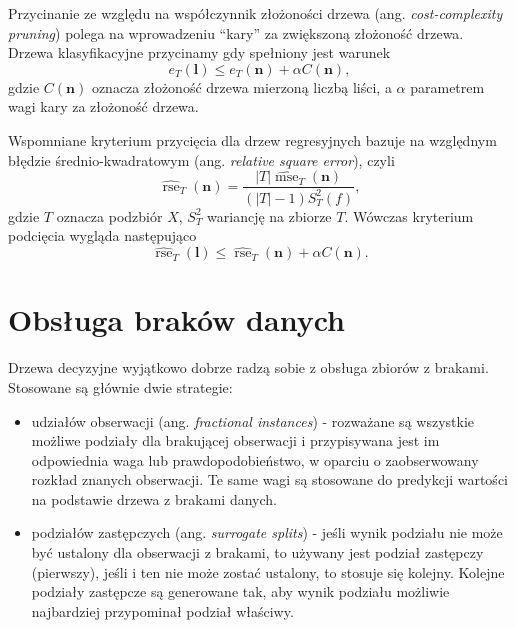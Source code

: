 \documentclass[
]{book}
\providecommand{\tightlist}{%
  \setlength{\itemsep}{0pt}\setlength{\parskip}{0pt}}
\theoremstyle{plain}
\theoremstyle{definition}
\theoremstyle{definition}
\theoremstyle{definition}
\theoremstyle{definition}
\theoremstyle{definition}
\theoremstyle{remark}
\begin{document}
Przycinanie ze względu na współczynnik złożoności drzewa (ang. \emph{cost-complexity pruning}) polega na wprowadzeniu ``kary'' za zwiększoną złożoność drzewa. Drzewa klasyfikacyjne przycinamy gdy spełniony jest warunek
\begin{equation}
    e_T(\mathbf{l})\leq e_T(\mathbf{n})+\alpha C(\mathbf{n}),
\end{equation}
gdzie \(C(\mathbf{n})\) oznacza złożoność drzewa mierzoną liczbą liści, a \(\alpha\) parametrem wagi kary za złożoność drzewa.

Wspomniane kryterium przycięcia dla drzew regresyjnych bazuje na względnym błędzie średnio-kwadratowym (ang. \emph{relative square error}), czyli
\begin{equation}\label{rse}
        \widehat{\operatorname{rse}}_T(\mathbf{n})=\frac{|T|\widehat{\operatorname{mse}}_T(\mathbf{n})}{(|T|-1)S^2_T(f)},
\end{equation}
gdzie \(T\) oznacza podzbiór \(X\), \(S^2_T\) wariancję na zbiorze \(T\).
Wówczas kryterium podcięcia wygląda następująco
\begin{equation}\label{kryterium3}
    \widehat{\operatorname{rse}}_T(\mathbf{l})\leq \widehat{\operatorname{rse}}_T(\mathbf{n})+\alpha C(\mathbf{n}).
\end{equation}

\section{Obsługa braków danych}\label{obsux142uga-brakuxf3w-danych}

Drzewa decyzyjne wyjątkowo dobrze radzą sobie z obsługa zbiorów z brakami. Stosowane są głównie dwie strategie:

\begin{itemize}
\tightlist
\item
  udziałów obserwacji (ang. \emph{fractional instances}) - rozważane są wszystkie możliwe podziały dla brakującej obserwacji i przypisywana jest im odpowiednia waga lub prawdopodobieństwo, w oparciu o zaobserwowany rozkład znanych obserwacji. Te same wagi są stosowane do predykcji wartości na podstawie drzewa z brakami danych.
\item
  podziałów zastępczych (ang. \emph{surrogate splits}) - jeśli wynik podziału nie może być ustalony dla obserwacji z brakami, to używany jest podział zastępczy (pierwszy), jeśli i ten nie może zostać ustalony, to stosuje się kolejny. Kolejne podziały zastępcze są generowane tak, aby wynik podziału możliwie najbardziej przypominał podział właściwy.
\end{itemize}
\end{document}
